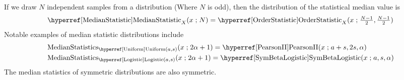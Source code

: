 

 If we draw $N$ independent samples from a distribution (Where $N$ is odd), then the distribution of the statistical median value is 
\label{MedianStatistic}
\begin{align*}
\opr{MedianStatistic}_{X}(x \given N) = \opr{OrderStatistic}_{X}(x \given \tfrac{N-1}{2},  \tfrac{N-1}{2})
\checked
\end{align*}
Notable examples of median statistic distributions include
\begin{align*}
\op{MedianStatistics}&_{\opr{Uniform}(a,s)}(x \given 2 \alpha +1 )
=  \opr{PearsonII}(x\given a+s, 2s, \alpha)
\checked
\\
\op{MedianStatistics}&_{\opr{Logistic}(a,s)}  (x \given 2 \alpha +1)
=  \opr{SymBetaLogistic}(x\given a, s, \alpha)
\checked
\end{align*}
The median statistics of symmetric distributions are also symmetric.



